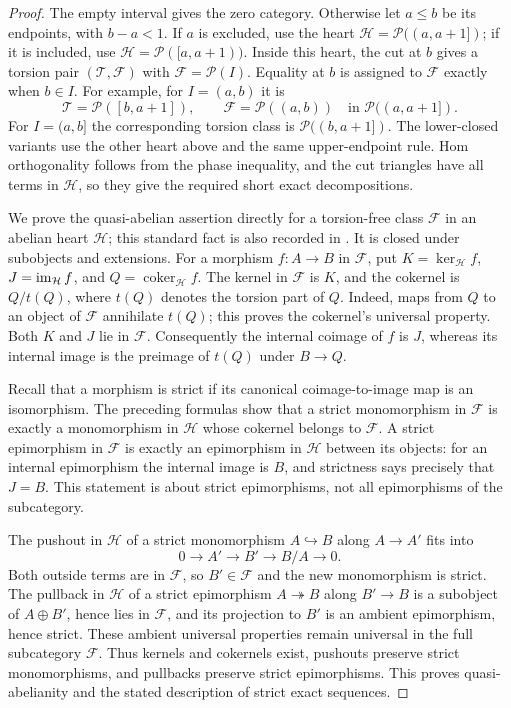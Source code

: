 \begin{proof}
The empty interval gives the zero category.  Otherwise let $a\le b$
be its endpoints, with $b-a<1$.  If $a$ is excluded, use the heart
$\mathcal H=\mathcal P((a,a+1])$; if it is included, use
$\mathcal H=\mathcal P([a,a+1))$.  Inside this heart, the cut at $b$
gives a torsion pair $(\mathcal T,\mathcal F)$ with
$\mathcal F=\mathcal P(I)$.  Equality at $b$ is assigned to
$\mathcal F$ exactly when $b\in I$.  For example, for $I=(a,b)$ it is
\[
 \mathcal T=\mathcal P([b,a+1]),\qquad
 \mathcal F=\mathcal P((a,b))
 \quad\text{in }\mathcal P((a,a+1]).
\]
For $I=(a,b]$ the corresponding torsion class is
$\mathcal P((b,a+1])$.  The lower-closed variants use the other heart
above and the same upper-endpoint rule.  Hom orthogonality follows from
the phase inequality, and the cut triangles have all terms in
$\mathcal H$, so they give the required short exact decompositions.

We prove the quasi-abelian assertion directly for a torsion-free class
$\mathcal F$ in an abelian heart $\mathcal H$; this standard fact is also
recorded in \cite[Lemma~3.1]{Tattar2021}.
It is closed under subobjects and extensions.  For a morphism
$f:A\to B$ in $\mathcal F$, put
$K=\ker_{\mathcal H}f$, $J=\operatorname{im}_{\mathcal H}f$, and
$Q=\operatorname{coker}_{\mathcal H}f$.
The kernel in $\mathcal F$ is $K$, and the cokernel is
$Q/t(Q)$, where $t(Q)$ denotes the torsion part of $Q$.
Indeed, maps from $Q$ to an object of $\mathcal F$ annihilate $t(Q)$;
this proves the cokernel's universal property.  Both $K$ and $J$ lie in
$\mathcal F$.  Consequently the internal coimage of $f$ is $J$, whereas
its internal image is the preimage of $t(Q)$ under $B\to Q$.

Recall that a morphism is strict if its canonical coimage-to-image map
is an isomorphism.  The preceding formulas show that a strict
monomorphism in $\mathcal F$ is exactly a monomorphism in $\mathcal H$
whose cokernel belongs to $\mathcal F$.  A strict epimorphism in
$\mathcal F$ is exactly an epimorphism in $\mathcal H$ between its
objects: for an internal epimorphism the internal image is $B$, and
strictness says precisely that $J=B$.  This statement is about strict
epimorphisms, not all epimorphisms of the subcategory.

The pushout in $\mathcal H$ of a strict monomorphism $A\hookrightarrow B$
along $A\to A'$ fits into
\[
 0\longrightarrow A'\longrightarrow B'\longrightarrow B/A
     \longrightarrow0.
\]
Both outside terms are in $\mathcal F$, so $B'\in\mathcal F$ and the
new monomorphism is strict.  The pullback in $\mathcal H$ of a strict
epimorphism $A\twoheadrightarrow B$ along $B'\to B$ is a subobject of
$A\oplus B'$, hence lies in $\mathcal F$, and its projection to $B'$ is
an ambient epimorphism, hence strict.  These ambient universal
properties remain universal in the full subcategory $\mathcal F$.
Thus kernels and cokernels exist, pushouts preserve strict
monomorphisms, and pullbacks preserve strict epimorphisms.  This proves
quasi-abelianity and the stated description of strict exact sequences.
\end{proof}

